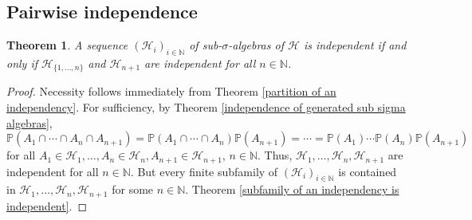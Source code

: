 \documentclass[11pt, a4paper, openany]{book}
\newtheorem{thm}{Theorem}\newtheorem{lem}{Lemma}\newtheorem{crl}{Corollary}
\theoremstyle{definition}
\begin{document}
\subsection{Pairwise independence}
    \begin{thm}
        A sequence $(\mathscr{H}_i)_{i\in\mathbb{N}}$ of sub-$\sigma$-algebras of $\mathscr{H}$ is independent if and only if $\mathscr{H}_{\{1,\dots,n\}}$ and $\mathscr{H}_{n+1}$ are independent for all $n\in\mathbb{N}$.
    \end{thm}
    \begin{proof}
        Necessity follows immediately from Theorem \ref{partition of an independency}. For sufficiency, by Theorem \ref{independence of generated sub sigma algebras},
        \[
            \mathbb{P}(A_1\cap\cdots\cap A_n\cap A_{n+1})=\mathbb{P}(A_1\cap\cdots\cap A_n)\mathbb{P}(A_{n+1})=\cdots=\mathbb{P}(A_1)\cdots \mathbb{P}(A_n)\mathbb{P}(A_{n+1})
        \]
        for all $A_1\in\mathscr{H}_1,\dots,A_n\in\mathscr{H}_n,A_{n+1}\in\mathscr{H}_{n+1}$, $n\in\mathbb{N}$. Thus, $\mathscr{H}_1,\dots,\mathscr{H}_n,\mathscr{H}_{n+1}$ are independent for all $n\in\mathbb{N}$. But every finite subfamily of $(\mathscr{H}_i)_{i\in\mathbb{N}}$ is contained in $\mathscr{H}_1,\dots,\mathscr{H}_n,\mathscr{H}_{n+1}$ for some $n\in\mathbb{N}$. Theorem \ref{subfamily of an independency is independent}.
    \end{proof}
\end{document}
